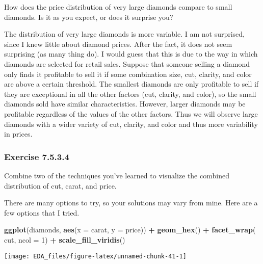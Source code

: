 \documentclass[]{book}
\newenvironment{Shaded}{\begin{snugshade}}{\end{snugshade}}
\newcommand{\DataTypeTok}[1]{\textcolor[rgb]{0.13,0.29,0.53}{#1}}
\newcommand{\DecValTok}[1]{\textcolor[rgb]{0.00,0.00,0.81}{#1}}
\newcommand{\KeywordTok}[1]{\textcolor[rgb]{0.13,0.29,0.53}{\textbf{#1}}}
\newcommand{\NormalTok}[1]{#1}
\newcommand{\OperatorTok}[1]{\textcolor[rgb]{0.81,0.36,0.00}{\textbf{#1}}}
\newcommand{\StringTok}[1]{\textcolor[rgb]{0.31,0.60,0.02}{#1}}
\theoremstyle{plain}
\theoremstyle{remark}
\begin{document}
How does the price distribution of very large diamonds compare to small
diamonds. Is it as you expect, or does it surprise you?

The distribution of very large diamonds is more variable. I am not
surprised, since I knew little about diamond prices. After the fact, it
does not seem surprising (as many thing do). I would guess that this is
due to the way in which diamonds are selected for retail sales. Suppose
that someone selling a diamond only finds it profitable to sell it if
some combination size, cut, clarity, and color are above a certain
threshold. The smallest diamonds are only profitable to sell if they are
exceptional in all the other factors (cut, clarity, and color), so the
small diamonds sold have similar characteristics. However, larger
diamonds may be profitable regardless of the values of the other
factors. Thus we will observe large diamonds with a wider variety of
cut, clarity, and color and thus more variability in prices.

\hypertarget{exercise-7.5.3.4}{%
\subsubsection*{\texorpdfstring{Exercise
{7.5.3.4}}{Exercise 7.5.3.4}}\label{exercise-7.5.3.4}}

Combine two of the techniques you've learned to visualize the combined
distribution of cut, carat, and price.

There are many options to try, so your solutions may vary from mine.
Here are a few options that I tried.

\begin{Shaded}
\begin{Highlighting}[]
\KeywordTok{ggplot}\NormalTok{(diamonds, }\KeywordTok{aes}\NormalTok{(}\DataTypeTok{x =}\NormalTok{ carat, }\DataTypeTok{y =}\NormalTok{ price)) }\OperatorTok{+}
\StringTok{  }\KeywordTok{geom_hex}\NormalTok{() }\OperatorTok{+}
\StringTok{  }\KeywordTok{facet_wrap}\NormalTok{(}\OperatorTok{~}\StringTok{ }\NormalTok{cut, }\DataTypeTok{ncol =} \DecValTok{1}\NormalTok{) }\OperatorTok{+}
\StringTok{  }\KeywordTok{scale_fill_viridis}\NormalTok{()}
\end{Highlighting}
\end{Shaded}

\begin{center}\texttt{[image: EDA\_files/figure-latex/unnamed-chunk-41-1]} \end{center}
\end{document}
